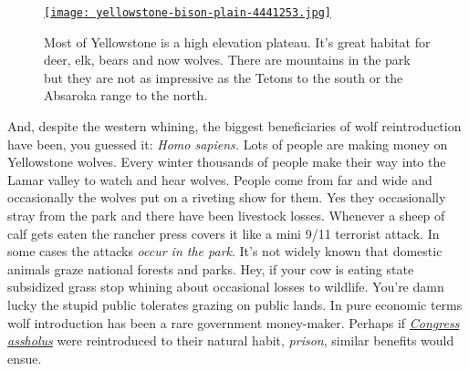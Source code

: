 \begin{SCfigure}
\centering
\href{http://conceptcontrol.smugmug.com/Trips/USA-and-Canada/North-Western/i-j7WcGTK/A}{\texttt{[image: yellowstone-bison-plain-4441253.jpg]}}
\caption{Most of Yellowstone is a high elevation plateau. It's great habitat for
deer, elk, bears and now wolves. There are mountains in the park but
they are not as impressive as the Tetons to the south or the Absaroka
range to the north.}
\label{fig:4186X3}
\end{SCfigure}


And, despite the western whining, the biggest beneficiaries of wolf
reintroduction have been, you guessed it: \emph{Homo sapiens.} Lots of
people are making money on Yellowstone wolves. Every winter thousands of
people make their way into the Lamar valley to watch and hear wolves.
People come from far and wide and occasionally the wolves put on a
riveting show for them. Yes they occasionally stray from the park and
there have been livestock losses. Whenever a sheep of calf gets eaten
the rancher press covers it like a mini 9/11 terrorist attack. In some
cases the attacks \emph{occur in the park}. It's not widely known that
domestic animals graze national forests and parks. Hey, if your cow is
eating state subsidized grass stop whining about occasional losses to
wildlife. You're damn lucky the stupid public tolerates grazing on
public lands. In pure economic terms wolf introduction has been a rare
government money-maker. Perhaps if
\href{http://www.urbandictionary.com/define.php?term=congress}{\emph{Congress
assholus}} were reintroduced to their natural habit, \emph{prison},
similar benefits would ensue.

